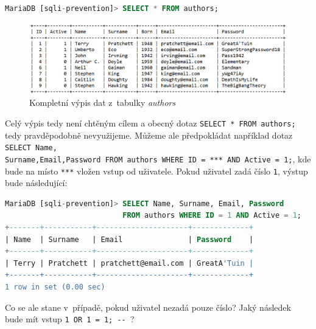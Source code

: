 \begin{lstlisting}[language=sql]
MariaDB [sqli-prevention]> SELECT * FROM authors;
\end{lstlisting}

\begin{figure}[h!]
    \label{fig:data_authors}
    \centering
    \includegraphics[scale=0.75]{obrazky-figures/table.pdf}
    \caption{Kompletní výpis dat z~tabulky \textit{authors}}
\end{figure}

\Bat{} Celý výpis tedy není chtěným cílem a obecný dotaz \texttt{SELECT * FROM authors;} tedy pravděpodobně nevyužijeme. Můžeme ale předpokládat
například dotaz \texttt{SELECT Name,\\Surname,Email,Password FROM authors WHERE ID = *** AND Active = 1;}, kde bude na místo \texttt{***}
vložen vstup od uživatele. Pokud uživatel zadá číslo \texttt{1}, výstup bude následující:

\begin{lstlisting}[language=sql]
MariaDB [sqli-prevention]> SELECT Name, Surname, Email, Password 
                           FROM authors WHERE ID = 1 AND Active = 1;
+-------+-----------+---------------------+-------------+
| Name  | Surname   | Email               | Password    |
+-------+-----------+---------------------+-------------+
| Terry | Pratchett | pratchett@email.com | GreatA'Tuin |
+-------+-----------+---------------------+-------------+
1 row in set (0.00 sec)
\end{lstlisting}

\Bat{} Co se ale stane v~případě, pokud uživatel nezadá pouze číslo? Jaký následek bude mít vstup \texttt{1 OR 1 = 1; -{}- }?

